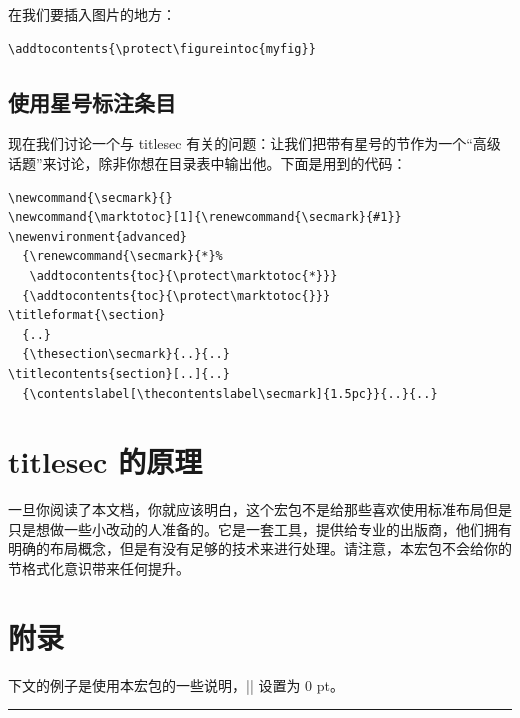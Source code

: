 \documentclass[a4paper,nofonts]{ltxguide}
\newcommand{\examplesep}{%
  \begin{center}%
    \rule{4pt}{4pt}%
  \end{center}}
\begin{document}
在我们要插入图片的地方：
\begin{verbatim}
\addtocontents{\protect\figureintoc{myfig}}
\end{verbatim}

\subsection{使用星号标注条目}

现在我们讨论一个与 \textsf{titlesec} 有关的问题：让我们把带有星号的节作为一个``高级话题''来讨论，除非你想在目录表中输出他。下面是用到的代码：
\begin{verbatim}
\newcommand{\secmark}{}
\newcommand{\marktotoc}[1]{\renewcommand{\secmark}{#1}}
\newenvironment{advanced}
  {\renewcommand{\secmark}{*}%
   \addtocontents{toc}{\protect\marktotoc{*}}}
  {\addtocontents{toc}{\protect\marktotoc{}}}
\titleformat{\section}
  {..}
  {\thesection\secmark}{..}{..}
\titlecontents{section}[..]{..}
  {\contentslabel[\thecontentslabel\secmark]{1.5pc}}{..}{..}
\end{verbatim}

\section{\textsf{titlesec} 的原理}

一旦你阅读了本文档，你就应该明白，这个宏包不是给那些喜欢使用标准布局但是只是想做一些小改动的人准备的。它是一套工具，提供给专业的出版商，他们拥有明确的布局概念，但是有没有足够的技术来进行处理。请注意，本宏包不会给你的节格式化意识带来任何提升。

\section{附录}

下文的例子是使用本宏包的一些说明，|\parskip| 设置为 0 pt。

\begingroup

\setlength{\parskip}{0pt}

\examplesep

\titleformat{\section}[block]
  {\normalfont\bfseries\filcenter}{\fbox{\itshape\thesection}}{1em}{}
\end{document}

